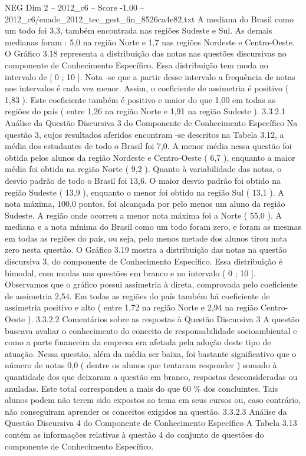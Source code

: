 \begin{textsample}{NEG Dim 2 – 2012\_c6 – Score -1.00 – 2012\_c6/enade\_2012\_tec\_gest\_fin\_8526ca4e82.txt}
A mediana do Brasil como um todo foi 3,3, também encontrada nas regiões Sudeste e Sul.
As demais medianas foram : 5,0 na região Norte e 1,7 nas regiões Nordeste e Centro-Oeste.
O Gráfico 3.18 representa a distribuição das notas nas questões discursivas no componente de Conhecimento Específico.
Essa distribuição tem moda no intervalo de [ 0 ; 10 ].
Nota -se que a partir desse intervalo a frequência de notas nos intervalos é cada vez menor.
Assim, o coeficiente de assimetria é positivo ( 1,83 ).
Este coeficiente também é positivo e maior do que 1,00 em todas as regiões do país ( entre 1,26 na região Norte e 1,91 na região Sudeste ). 3.3.2.1 Análise da Questão Discursiva 3 do Componente de Conhecimento Específico Na questão 3, cujos resultados aferidos encontram -se descritos na Tabela 3.12, a média dos estudantes de todo o Brasil foi 7,0.
A menor média nessa questão foi obtida pelos alunos da região Nordeste e Centro-Oeste ( 6,7 ), enquanto a maior média foi obtida na região Norte ( 9,2 ).
Quanto à variabilidade das notas, o desvio padrão de todo o Brasil foi 13,6.
O maior desvio padrão foi obtido na região Sudeste ( 13,9 ), enquanto o menor foi obtido na região Sul ( 13,1 ).
A nota máxima, 100,0 pontos, foi alcançada por pelo menos um aluno da região Sudeste.
A região onde ocorreu a menor nota máxima foi a Norte ( 55,0 ).
A mediana e a nota mínima do Brasil como um todo foram zero, e foram as mesmas em todas as regiões do país, ou seja, pelo menos metade dos alunos tirou nota zero nesta questão.
O Gráfico 3.19 mostra a distribuição das notas na questão discursiva 3, do componente de Conhecimento Específico.
Essa distribuição é bimodal, com modas nas questões em branco e no intervalo ( 0 ; 10 ].
Observamos que o gráfico possui assimetria à direta, comprovada pelo coeficiente de assimetria 2,54.
Em todas as regiões do país também há coeficiente de assimetria positivo e alto ( entre 1,72 na região Norte e 2,94 na região Centro-Oeste ). 3.3.2.2 Comentários sobre as respostas à Questão Discursiva 3 A questão buscava avaliar o conhecimento do conceito de responsabilidade socioambiental e como a parte financeira da empresa era afetada pela adoção deste tipo de atuação.
Nessa questão, além da média ser baixa, foi bastante significativo que o número de notas 0,0 ( dentre os alunos que tentaram responder ) somado à quantidade dos que deixaram a questão em branco, respostas desconsideradas ou anuladas.
Este total correspondeu a mais do que 60 \% dos concluintes.
Tais alunos podem não terem sido expostos ao tema em seus cursos ou, caso contrário, não conseguiram aprender os conceitos exigidos na questão. 3.3.2.3 Análise da Questão Discursiva 4 do Componente de Conhecimento Específico A Tabela 3.13 contém as informações relativas à questão 4 do conjunto de questões do componente de Conhecimento Específico.

\end{textsample}
